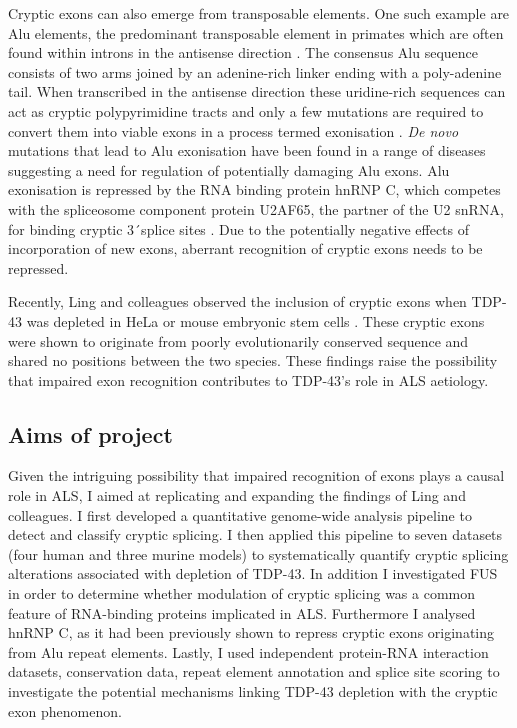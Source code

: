 Cryptic exons can also emerge from transposable elements. One such example are Alu elements, the predominant transposable element in primates which are often found within introns in the antisense direction \citep{Deininger2011-hc}. The consensus Alu sequence consists of two arms joined by an adenine-rich linker ending with a poly-adenine tail.  When transcribed in the antisense direction these uridine-rich sequences can act as cryptic polypyrimidine tracts and only a few mutations are required to convert them into viable exons in a process termed exonisation \citep{Sorek2002-cm}. \textit{De novo} mutations that lead to Alu exonisation have been found in a range of diseases \citep{Vorechovsky2010-or} suggesting a need for regulation of potentially damaging Alu exons. Alu exonisation is repressed by the RNA binding protein hnRNP C, which competes with the spliceosome component protein U2AF65, the partner of the U2 snRNA, for binding cryptic 3\'\ splice sites \citep{Zarnack2013-nv}. Due to the potentially negative effects of incorporation of new exons, aberrant recognition of cryptic exons needs to be repressed.

Recently, Ling and colleagues observed the inclusion of cryptic exons when TDP-43 was depleted in HeLa or mouse embryonic stem cells \citep{Ling2015}. These cryptic exons were shown to originate from poorly evolutionarily conserved sequence and shared no positions between the two species. These findings raise the possibility that impaired exon recognition contributes to TDP-43's role in ALS aetiology.


\subsection{Aims of project}

Given the intriguing possibility that impaired recognition of exons plays a causal role in ALS, I aimed at replicating and expanding the findings of Ling and colleagues. I first developed a quantitative genome-wide analysis pipeline to detect and classify cryptic splicing. I then applied this pipeline to seven datasets (four human and three murine models) to systematically quantify cryptic splicing alterations associated with depletion of TDP-43. In addition I investigated FUS in order to determine whether modulation of cryptic splicing was a common feature of RNA-binding proteins implicated in ALS. Furthermore I analysed hnRNP C, as it had been previously shown to repress cryptic exons originating from Alu repeat elements. Lastly, I used independent protein-RNA interaction datasets, conservation data, repeat element annotation and splice site scoring to investigate the potential mechanisms linking TDP-43 depletion with the cryptic exon phenomenon.

